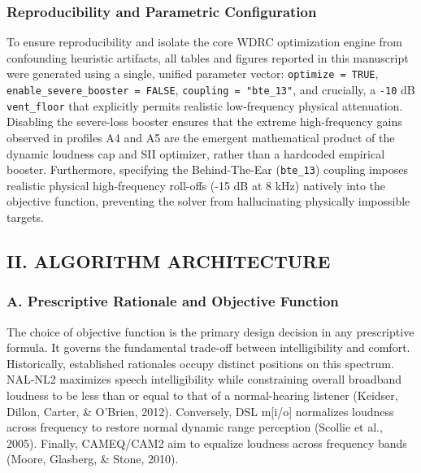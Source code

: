 \documentclass[
  12pt,
]{article}
\begin{document}
\subsubsection{Reproducibility and Parametric
Configuration}\label{reproducibility-and-parametric-configuration}

To ensure reproducibility and isolate the core WDRC optimization engine
from confounding heuristic artifacts, all tables and figures reported in
this manuscript were generated using a single, unified parameter vector:
\texttt{optimize\ =\ TRUE}, \texttt{enable\_severe\_booster\ =\ FALSE},
\texttt{coupling\ =\ "bte\_13"}, and crucially, a \texttt{-10} dB
\texttt{vent\_floor} that explicitly permits realistic low-frequency
physical attenuation. Disabling the severe-loss booster ensures that the
extreme high-frequency gains observed in profiles A4 and A5 are the
emergent mathematical product of the dynamic loudness cap and SII
optimizer, rather than a hardcoded empirical booster. Furthermore,
specifying the Behind-The-Ear (\texttt{bte\_13}) coupling imposes
realistic physical high-frequency roll-offs (-15 dB at 8 kHz) natively
into the objective function, preventing the solver from hallucinating
physically impossible targets.

\subsection{II. ALGORITHM
ARCHITECTURE}\label{ii.-algorithm-architecture}

\subsubsection{A. Prescriptive Rationale and Objective
Function}\label{a.-prescriptive-rationale-and-objective-function}

The choice of objective function is the primary design decision in any
prescriptive formula. It governs the fundamental trade-off between
intelligibility and comfort. Historically, established rationales occupy
distinct positions on this spectrum. NAL-NL2 maximizes speech
intelligibility while constraining overall broadband loudness to be less
than or equal to that of a normal-hearing listener (Keidser, Dillon,
Carter, \& O'Brien, 2012). Conversely, DSL m{[}i/o{]} normalizes
loudness across frequency to restore normal dynamic range perception
(Scollie et al., 2005). Finally, CAMEQ/CAM2 aim to equalize loudness
across frequency bands (Moore, Glasberg, \& Stone, 2010).
\end{document}
